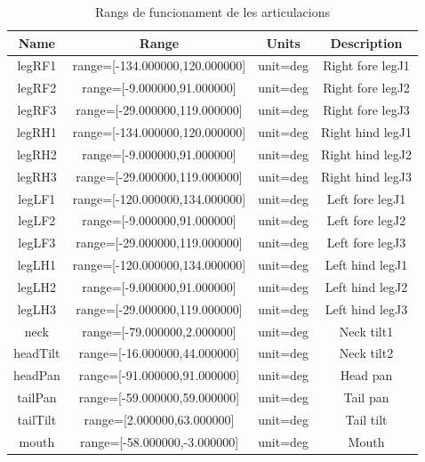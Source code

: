 \documentclass[12pt,a4paper,final,twoside]{article}
\begin{document}
\begin{table}[h!]
\begin{center}
\begin{tabular}{| c | c | c | c |}
\hline
Name & Range & Units & Description\\ \hline \hline
legRF1    &    range=[-134.000000,120.000000]  & unit=deg & Right fore legJ1\\
legRF2    &    range=[-9.000000,91.000000]     & unit=deg & Right fore legJ2\\
legRF3    &    range=[-29.000000,119.000000]   & unit=deg & Right fore legJ3\\
legRH1    &    range=[-134.000000,120.000000]  & unit=deg & Right hind legJ1\\
legRH2    &    range=[-9.000000,91.000000]     & unit=deg & Right hind legJ2\\
legRH3    &    range=[-29.000000,119.000000]   & unit=deg & Right hind legJ3\\
legLF1    &    range=[-120.000000,134.000000]  & unit=deg & Left fore legJ1\\
legLF2    &    range=[-9.000000,91.000000]     & unit=deg & Left fore legJ2\\
legLF3    &    range=[-29.000000,119.000000]   & unit=deg & Left fore legJ3\\
legLH1    &    range=[-120.000000,134.000000]  & unit=deg & Left hind legJ1\\
legLH2    &    range=[-9.000000,91.000000]     & unit=deg & Left hind legJ2\\
legLH3    &    range=[-29.000000,119.000000]   & unit=deg & Left hind legJ3\\
neck      &    range=[-79.000000,2.000000]     & unit=deg & Neck tilt1\\
headTilt  &    range=[-16.000000,44.000000]    & unit=deg & Neck tilt2\\
headPan   &    range=[-91.000000,91.000000]    & unit=deg & Head pan\\
tailPan   &    range=[-59.000000,59.000000]    & unit=deg & Tail pan\\
tailTilt  &    range=[2.000000,63.000000]      & unit=deg & Tail tilt\\
mouth     &    range=[-58.000000,-3.000000]    & unit=deg & Mouth\\
\hline
\end{tabular}
\end{center}
\caption{Rangs de funcionament de les articulacions \cite{Urbi_Docs}}
\end{table}
\end{document}
